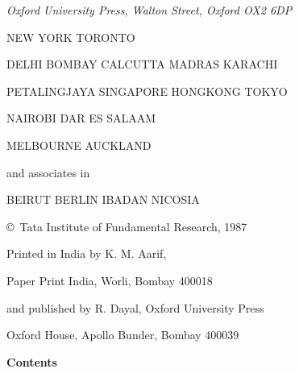 \begin{center}
{\em Oxford University Press, Walton Street, Oxford OX2 6DP}
\medskip

NEW YORK TORONTO

DELHI BOMBAY CALCUTTA MADRAS KARACHI

PETALINGJAYA SINGAPORE HONGKONG TOKYO

NAIROBI DAR ES SALAAM

MELBOURNE AUCKLAND

\bigskip

and associates in
\smallskip

BEIRUT BERLIN IBADAN NICOSIA


\vskip 1cm

\copyright\ Tata Institute of Fundamental Research, 1987

\vfill

Printed in India by K. M. Aarif,

Paper Print India, Worli, Bombay 400018

and published by R. Dayal, Oxford University Press

Oxford House, Apollo Bunder, Bombay 400039
\end{center}

\eject

\thispagestyle{empty}

\noindent
{\bf\huge Contents}

\vskip 1cm


